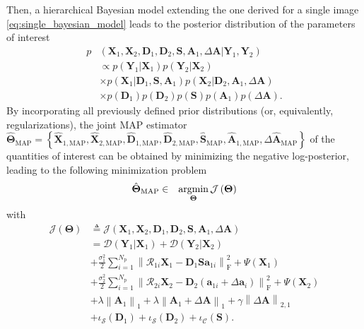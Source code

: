 \documentclass[review]{elsarticle}
\newcommand{\Npatch}{N_{\mathrm{p}}}
\begin{document}
Then, a  hierarchical Bayesian model extending the one derived for a single image \eqref{eq:single_bayesian_model} leads to the posterior distribution of the parameters of interest
%
\begin{equation}
\begin{aligned}
\label{eq:coupled_bayesian_model}
p&\left(\mathbf{X}_{1},\mathbf{X}_{2},\mathbf{D}_{1},\mathbf{D}_{2},\mathbf{S},\mathbf{A}_{1},\Delta\mathbf{A}|\mathbf{Y}_{1},\mathbf{Y}_{2}\right)  \\ &\propto p(\mathbf{Y}_{1}|\mathbf{X}_{1}) p(\mathbf{Y}_{2}|\mathbf{X}_{2}) \\
&\times p(\mathbf{X}_{1}|\mathbf{D}_{1},\mathbf{S},\mathbf{A}_{1}) p(\mathbf{X}_{2}|\mathbf{D}_{2},\mathbf{A}_{1},\Delta\mathbf{A})\\
&\times p(\mathbf{D}_{1})p(\mathbf{D}_{2})p(\mathbf{S})p(\mathbf{A}_{1})p(\Delta\mathbf{A}).
\end{aligned}
\end{equation}
%
By incorporating all previously defined prior distributions (or, equivalently, regularizations), the joint MAP estimator $\hat{\boldsymbol{\Theta}}_{\text{MAP}} = \left\{\hat{\mathbf{X}}_{1,{\text{MAP}}},\hat{\mathbf{X}}_{2,{\text{MAP}}},\hat{\mathbf{D}}_{1,{\text{MAP}}},\hat{\mathbf{D}}_{2,{\text{MAP}}},\hat{\mathbf{S}}_{\text{MAP}},\hat{\mathbf{A}}_{1,{\text{MAP}}},\Delta\hat{\mathbf{A}}_{{\text{MAP}}}\right\}$ of the quantities of interest can be obtained by minimizing the negative log-posterior, leading to the following minimization problem
%
\begin{equation}
	\label{eq:map_coupled}
    \begin{aligned}
    &\hat{\boldsymbol{\Theta}}_{\text{MAP}} \in
    &\mathop{\rm argmin}\limits_{\boldsymbol{\Theta}}   \mathcal{J}\left(\boldsymbol{\Theta}\right)
    \end{aligned}
\end{equation}
%
with
%
\begin{equation}
\begin{aligned}
	\label{eq:objective_coupled_den}
  \mathcal{J}\left(\boldsymbol{\Theta}\right) &\triangleq  \mathcal{J}\left(\mathbf{X}_{1},\mathbf{X}_{2},\mathbf{D}_{1},\mathbf{D}_{2},\mathbf{S},\mathbf{A}_{1},\Delta\mathbf{A}\right) \\
  &=\mathcal{D}(\mathbf{Y}_{1}|\mathbf{X}_{1}) + \mathcal{D}(\mathbf{Y}_{2}|\mathbf{X}_{2}) \\
  &+\frac{\sigma_{1}^2}{2}\sum_{i=1}^{\Npatch}\left\|\mathcal{R}_{1{i}}\mathbf{X}_{1} - \mathbf{D}_{1}\mathbf{S}\mathbf{a}_{1{i}}\right\|_{\mathrm{F}}^{2} + \Psi\left(\mathbf{X}_{1}\right) \\
  &+  \frac{\sigma_{2}^2}{2}\sum_{i=1}^{\Npatch}\left\|\mathcal{R}_{2{i}}\mathbf{X}_{2} - \mathbf{D}_{2}\left(\mathbf{a}_{1{i}} + \Delta\mathbf{a}_{i}\right)\right\|_{\mathrm{F}}^{2}  + \Psi\left(\mathbf{X}_{2}\right)\\
  &+ \lambda \left\|\mathbf{A}_{1}\right\|_1 + \lambda \left\|\mathbf{A}_{1}+\Delta\mathbf{A}\right\|_1  + \gamma \left\|\Delta\mathbf{A}\right\|_{2,1}\\
 &+\iota_{\mathcal{S}}(\mathbf{D}_{1}) + \iota_{\mathcal{S}}(\mathbf{D}_{2}) + \iota_{\mathcal{C}}(\mathbf{S}).
\end{aligned}
\end{equation}
\end{document}
